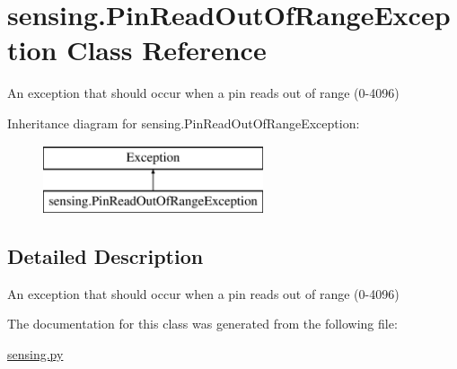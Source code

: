 \hypertarget{classsensing_1_1_pin_read_out_of_range_exception}{\section{sensing.\-Pin\-Read\-Out\-Of\-Range\-Exception Class Reference}
\label{classsensing_1_1_pin_read_out_of_range_exception}
}


An exception that should occur when a pin reads out of range (0-\/4096)  


Inheritance diagram for sensing.\-Pin\-Read\-Out\-Of\-Range\-Exception\-:\begin{figure}[H]
\begin{center}
\leavevmode
\includegraphics[height=2.000000cm]{classsensing_1_1_pin_read_out_of_range_exception}
\end{center}
\end{figure}


\subsection{Detailed Description}
An exception that should occur when a pin reads out of range (0-\/4096) 

The documentation for this class was generated from the following file\-:\begin{DoxyCompactItemize}
\item 
\hyperlink{sensing_8py}{sensing.\-py}\end{DoxyCompactItemize}
